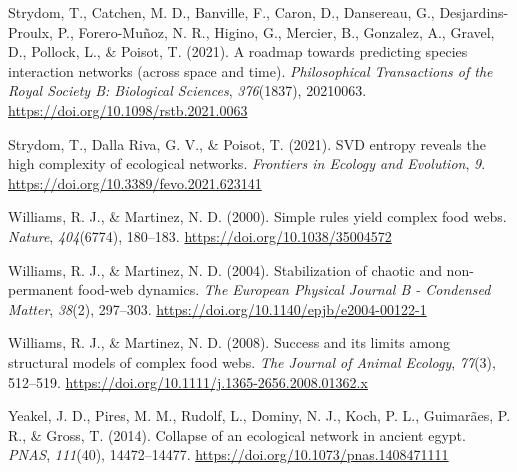 \documentclass[
]{article}
\newlength{\cslhangindent}
\newenvironment{CSLReferences}[2] %
 {\begin{list}{}{%
  \setlength{\itemindent}{0pt}
  \setlength{\leftmargin}{0pt}
  \setlength{\parsep}{0pt}
  \ifodd #1
   \setlength{\leftmargin}{\cslhangindent}
   \setlength{\itemindent}{-1\cslhangindent}
  \fi
  \setlength{\itemsep}{#2\baselineskip}}}
 {\end{list}}
\begin{document}
\begin{CSLReferences}{1}{0}
Strydom, T., Catchen, M. D., Banville, F., Caron, D., Dansereau, G.,
Desjardins-Proulx, P., Forero-Muñoz, N. R., Higino, G., Mercier, B.,
Gonzalez, A., Gravel, D., Pollock, L., \& Poisot, T. (2021). A roadmap
towards predicting species interaction networks (across space and time).
\emph{Philosophical Transactions of the Royal Society B: Biological
Sciences}, \emph{376}(1837), 20210063.
\url{https://doi.org/10.1098/rstb.2021.0063}

Strydom, T., Dalla Riva, G. V., \& Poisot, T. (2021). SVD entropy
reveals the high complexity of ecological networks. \emph{Frontiers in
Ecology and Evolution}, \emph{9}.
\url{https://doi.org/10.3389/fevo.2021.623141}

Williams, R. J., \& Martinez, N. D. (2000). Simple rules yield complex
food webs. \emph{Nature}, \emph{404}(6774), 180--183.
\url{https://doi.org/10.1038/35004572}

Williams, R. J., \& Martinez, N. D. (2004). Stabilization of chaotic and
non-permanent food-web dynamics. \emph{The European Physical Journal B -
Condensed Matter}, \emph{38}(2), 297--303.
\url{https://doi.org/10.1140/epjb/e2004-00122-1}

Williams, R. J., \& Martinez, N. D. (2008). Success and its limits among
structural models of complex food webs. \emph{The Journal of Animal
Ecology}, \emph{77}(3), 512--519.
\url{https://doi.org/10.1111/j.1365-2656.2008.01362.x}

Yeakel, J. D., Pires, M. M., Rudolf, L., Dominy, N. J., Koch, P. L.,
Guimarães, P. R., \& Gross, T. (2014). Collapse of an ecological network
in ancient egypt. \emph{PNAS}, \emph{111}(40), 14472--14477.
\url{https://doi.org/10.1073/pnas.1408471111}

\end{CSLReferences}
\end{document}
